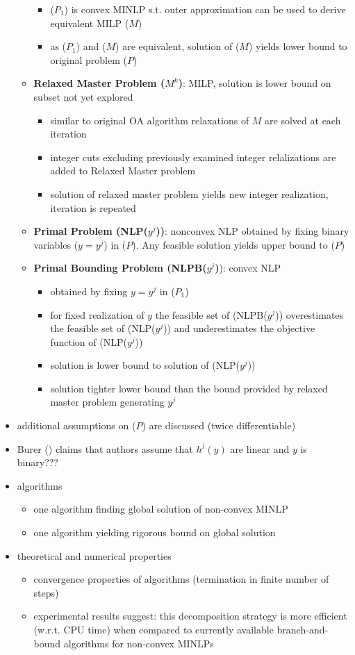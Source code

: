 \documentclass{article}
\begin{document}
\begin{itemize}
\begin{itemize}
		\begin{itemize}
		\item ($P_1$) is convex MINLP s.t. outer approximation can be used to derive equivalent MILP ($M$)
		\item as ($P_1$) and ($M$) are equivalent, solution of ($M$) yields lower bound to original problem ($P$)
		\end{itemize}
	\item \textbf{Relaxed Master Problem ($M^k$)}: MILP, solution is lower bound on subset not yet explored
		\begin{itemize}
		\item similar to original OA algorithm relaxations of $M$ are solved at each iteration 
		\item integer cuts excluding previously examined integer relalizations are added to Relaxed Master problem
		\item solution of relaxed master problem yields new integer realization, iteration is repeated
		\end{itemize}
	\item \textbf{Primal Problem (NLP($y^j$))}: nonconvex NLP obtained by fixing binary variables ($y=y^j$) in ($P$). Any feasible solution yields upper bound to ($P$)
	\item \textbf{Primal Bounding Problem (NLPB($y^j$)}): convex NLP
		\begin{itemize}
		\item obtained by fixing $y=y^j$ in ($P_1$)
		\item for fixed realization of $y$ the feasible set of (NLPB($y^j$)) overestimates the feasible set of (NLP($y^j$)) and underestimates the objective function of (NLP($y^j$))
		\item solution is lower bound to solution of (NLP($y^j$))
		\item solution tighter lower bound than the bound provided by relaxed master problem generating $y^j$
		\end{itemize}
	\end{itemize}
\item additional assumptions on ($P$) are discussed (twice differentiable)
\item Burer (\cite{burer2012non}) claims that authors assume that $h^j(y)$ are linear and $y$ is binary???
\item algorithms
	\begin{itemize}
	\item one algorithm finding global solution of non-convex MINLP
	\item one algorithm yielding rigorous bound on global solution
	\end{itemize}
\item theoretical and numerical properties
	\begin{itemize}
	\item convergence properties of algorithms (termination in finite number of steps)
	\item experimental results suggest: this decomposition strategy is more efficient (w.r.t. CPU time) when compared to currently available branch-and-bound algorithms for non-convex MINLPs
	\end{itemize}
\end{itemize}
\newpage
\end{document}
